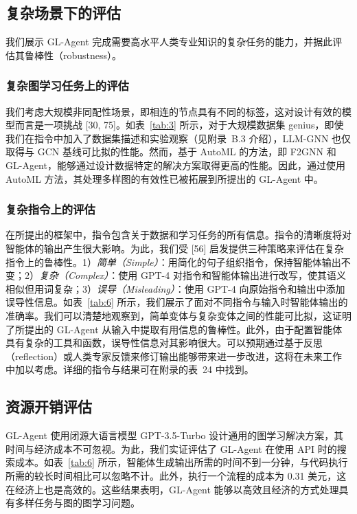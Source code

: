 \documentclass[11pt,UTF8,fontset=fandol]{ctexart}
\begin{document}
\subsection{复杂场景下的评估}

我们展示 GL-Agent 完成需要高水平人类专业知识的复杂任务的能力，并据此评估其鲁棒性（robustness）。

\subsubsection{复杂图学习任务上的评估}
我们考虑大规模非同配性场景，即相连的节点具有不同的标签，这对设计有效的模型而言是一项挑战 [30, 75]。如表~\ref{tab:3} 所示，对于大规模数据集 genius，即使我们在指令中加入了数据集描述和实验观察（见附录~B.3 介绍），LLM-GNN 也仅取得与 GCN 基线可比拟的性能。然而，基于 AutoML 的方法，即 F2GNN 和 GL-Agent，能够通过设计数据特定的解决方案取得更高的性能。因此，通过使用 AutoML 方法，其处理多样图的有效性已被拓展到所提出的 GL-Agent 中。

\subsubsection{复杂指令上的评估}
在所提出的框架中，指令包含关于数据和学习任务的所有信息。指令的清晰度将对智能体的输出产生很大影响。为此，我们受 [56] 启发提供三种策略来评估在复杂指令上的鲁棒性。1）\textit{简单（Simple）}：用简化的句子组织指令，保持智能体输出不变；2）\textit{复杂（Complex）}：使用 GPT-4 对指令和智能体输出进行改写，使其语义相似但用词复杂；3）\textit{误导（Misleading）}：使用 GPT-4 向原始指令和输出中添加误导性信息。如表~\ref{tab:6} 所示，我们展示了面对不同指令与输入时智能体输出的准确率。我们可以清楚地观察到，简单变体与复杂变体之间的性能可比拟，这证明了所提出的 GL-Agent 从输入中提取有用信息的鲁棒性。此外，由于配置智能体具有复杂的工具和函数，误导性信息对其影响很大。可以预期通过基于反思（reflection）或人类专家反馈来修订输出能够带来进一步改进，这将在未来工作中加以考虑。详细的指令与结果可在附录的表~24 中找到。

\subsection{资源开销评估}

GL-Agent 使用闭源大语言模型 GPT-3.5-Turbo 设计通用的图学习解决方案，其时间与经济成本不可忽视。为此，我们实证评估了 GL-Agent 在使用 API 时的搜索成本。如表~\ref{tab:6} 所示，智能体生成输出所需的时间不到一分钟，与代码执行所需的较长时间相比可以忽略不计。此外，执行一个流程的成本为 0.31 美元，这在经济上也是高效的。这些结果表明，GL-Agent 能够以高效且经济的方式处理具有多样任务与图的图学习问题。
\end{document}
